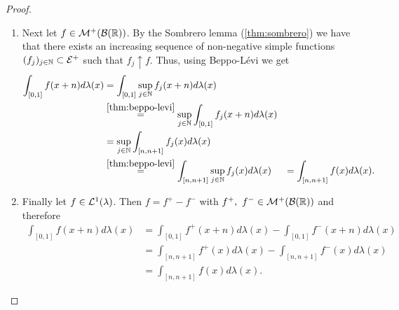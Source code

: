 \begin{proof}
\begin{enumerate}
\begin{enumerate}
			\item Next let $f \in \mathcal{M}^+(\mathcal{B}(\mathbb{R}))$. By the Sombrero lemma (\autoref{thm:sombrero}) we have that there exists an increasing sequence of non-negative simple functions $(f_j)_{j\in\mathbb{N}} \subset \mathcal{E}^+$ such that $f_j \uparrow f$. Thus, using Beppo-Lévi we get
			\begin{align*}
				\int_{[0,1]} f(x+n)d\lambda(x)
				&= \int_{[0,1]} \sup_{j \in \mathbb{N}} f_j(x+n)d\lambda(x)\\
				&\overset{\ref{thm:beppo-levi}}{=} \sup_{j\in\mathbb{N}} \int_{[0,1]} f_j(x + n)d\lambda(x)\\
				&= \sup_{j\in\mathbb{N}} \int_{[n, n+1]} f_j(x) d\lambda(x)\\
				&\overset{\ref{thm:beppo-levi}}{=} \int_{[n, n+1]} \sup_{j \in \mathbb{N}} f_j(x) d\lambda(x)
				&= \int_{[n, n+1]} f(x) d\lambda(x).
			\end{align*}
			
			\item Finally let $f\in \mathcal{L}^1(\lambda)$. Then $f = f^+ - f^-$ with $f^+,\ f^- \in \mathcal{M}^+(\mathcal{B}(\mathbb{R}))$ and therefore
			\begin{align*}
				\int_{[0,1]} f(x + n)d\lambda(x)
				&= \int_{[0,1]}f^+(x + n)d\lambda(x) - \int_{[0,1]}f^-(x + n)d\lambda(x)\\
				&= \int_{[n, n+1]} f^+(x)d\lambda(x) - \int_{[n, n+1]}f^-(x) d\lambda(x)\\
				&= \int_{[n, n+1]} f(x)d\lambda(x).
			\end{align*}
		\end{enumerate}
	

\end{enumerate}
\end{proof}

